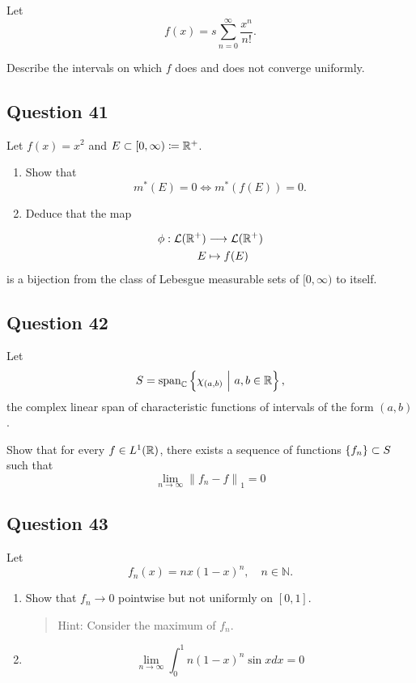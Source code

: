 \documentclass[12pt]{article}
\begin{document}
Let \[
f(x) = s \sum_{n=0}^{\infty} \frac{x^{n}}{n !}.
\]

Describe the intervals on which \(f\) does and does not converge
uniformly.

\hypertarget{question-41-1}{%
\subsection{Question 41}\label{question-41-1}}

Let \(f(x) = x^2\) and \(E \subset [0, \infty) \coloneqq {\mathbb{R}}^+\).

\begin{enumerate}
\def\labelenumi{\arabic{enumi}.}
\item
  Show that \[
  m^*(E) = 0 \iff m^*(f(E)) = 0.
  \]
\item
  Deduce that the map
\end{enumerate}

\begin{align*}
\phi: \mathcal{L}({\mathbb{R}}^+) &\longrightarrow \mathcal{L}({\mathbb{R}}^+) \\
E &\mapsto f(E)
\end{align*} is a bijection from the class of Lebesgue measurable sets
of \([0, \infty)\) to itself.

\hypertarget{question-42-1}{%
\subsection{Question 42}\label{question-42-1}}

Let \[
S = {\mathrm{span}}_{\mathbb{C}}\left\{{\chi_{(a, b)} {~\mathrel{\Big|}~} a, b \in {\mathbb{R}}}\right\},
\] the complex linear span of characteristic functions of intervals of
the form \((a, b)\).

Show that for every \(f\in L^1({\mathbb{R}})\), there exists a sequence of
functions \(\left\{{f_n}\right\} \subset S\) such that \[
\lim _{n \rightarrow \infty}\left\|f_{n}-f\right\|_{1}=0
\]

\hypertarget{question-43-1}{%
\subsection{Question 43}\label{question-43-1}}

Let \[
f_{n}(x)=n x(1-x)^{n}, \quad n \in \mathbb{N}.
\]

\begin{enumerate}
\def\labelenumi{\arabic{enumi}.}
\item
  Show that \(f_n \to 0\) pointwise but not uniformly on \([0, 1]\).

  \begin{quote}
  Hint: Consider the maximum of \(f_n\).
  \end{quote}
\item
  \[
  \lim _{n \rightarrow \infty} \int_{0}^{1} n(1-x)^{n} \sin x d x=0
  \]
\end{enumerate}
\end{document}
